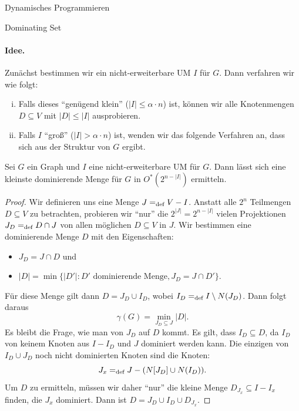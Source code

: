\begin{chapter}{Dynamisches Programmieren}
\begin{section}{Dominating Set}
  \paragraph{Idee.} Zunächst bestimmen wir ein nicht-erweiterbare UM \(I\) für $G$. Dann verfahren wir wie folgt:
  \begin{enumerate}[i)]
   \item Falls dieses ``genügend klein'' ($|I| \leq\alpha \cdot n$) ist, können wir alle Knotenmengen \(D \subseteq V\) mit \(|D| \leq |I|\) ausprobieren. 
   \item Falls \(I\) ``groß'' ($|I| > \alpha \cdot n$) ist, wenden wir das folgende Verfahren an, dass sich aus der Struktur von $G$ ergibt.
  \end{enumerate}

  \begin{lemma}
    Sei \(G\) ein Graph und \(I\) eine nicht-erweiterbare UM für $G$. Dann lässt sich eine kleinste dominierende Menge für $G$ in \(O^*(2^{n-|I|})\) ermitteln.
  \end{lemma}


  \begin{proof}
    Wir definieren uns eine Menge $J =_\text{def} V -I$. Anstatt alle $2^n$ Teilmengen $D\subseteq V$ zu betrachten, probieren wir ``nur'' die $2^{|J|} = 2^{n-|I|}$ vielen Projektionen \(J_D =_\text{def} D \cap J\) von allen möglichen $D\subseteq V$ in $J$. Wir bestimmen eine dominierende Menge $D$ mit den Eigenschaften: 
    \begin{itemize}
     \item $J_D = J \cap D$ und 
     \item $|D| = \min \{|D'|: D' \text{ dominierende Menge}, J_D = J \cap D'\}$.
    \end{itemize}
    Für diese Menge gilt dann $D = J_D \cup I_D$, wobei \(I_D =_\text{def} I \setminus N(J_D)\). Dann folgt daraus 
    \[\gamma(G) = \min_{J_D \subseteq J} |D|\text{.}\]
    Es bleibt die Frage, wie man von $J_D$ auf $D$ kommt. Es gilt, dass $I_D \subseteq D$, da $I_D$ von keinem Knoten aus $I - I_D$ und $J$ dominiert werden kann. Die einzigen von $I_D \cup J_D$ noch nicht dominierten Knoten sind die Knoten:
    \[J_x =_\text{def} J - (N[J_D]\cup N(I_D))\text{.}\]
    Um $D$ zu ermitteln, müssen wir daher ``nur'' die kleine Menge $D_{J_x} \subseteq I - I_x$ finden, die $J_x$ dominiert. Dann ist $D= J_D \cup I_D \cup D_{J_x}$.

  
  \end{proof}  


\end{section}
\end{chapter}

